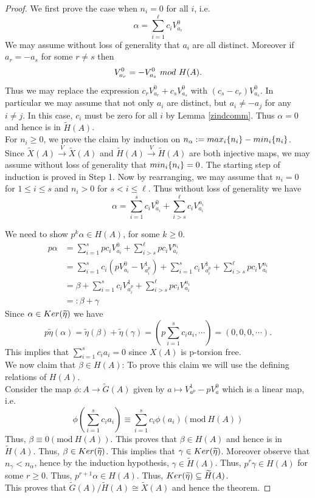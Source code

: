 \documentclass[10pt]{amsart}
\theoremstyle{plain}
\theoremstyle{definition}
\newcommand{\Ker}{{\rm Ker  }}
\renewcommand{\tilde}{\widetilde}
\newcommand{\ac}[1]{\{#1\}}
\begin{document}
\begin{proof}
 We first prove the case when $n_i=0$ for all $i$, i.e. 
$$ \alpha = \sum_{i=1}^\ell c_iV^0_{a_i}$$ 
We may assume without loss of generality that $a_i$ are all distinct. Moreover if $a_r=-a_s$ for some $r\neq s$ then 
$$ V^0_{a_r} = - V^0_{a_s} \ {\rm  mod} \ H(A).$$ Thus we may replace the expression $c_rV^0_{a_r}+c_sV^0_{a_s}$ with  $(c_s-c_r)V^0_{a_s}$. In particular we may assume that not only $a_i$ are distinct, but $a_i\neq -a_j$ for any $i\neq j$. In this case, $c_i$ must be zero for all $i$ by Lemma \ref{zindcomm}. Thus $\alpha=0$ and hence is in $\tilde{H}(A)$. \\

 For $n_i \geq 0$, we prove the claim by induction on $n_{\alpha}: = {\rm max}_i\ac{n_i}- {\rm min}_i \ac{n_i}$. Since $\tilde{X}(A) \xrightarrow{V} \tilde{X}(A)$ and $\tilde{H}(A)\xrightarrow{V} \tilde{H}(A)$ are both injective maps, we may assume without loss of generality that ${\rm min}_i \ac{n_i} = 0$.  The starting step of induction is proved in Step 1. Now by rearranging, we may assume that $n_i = 0$ for $1\leq i \leq s$ and $n_i>0$ for $s < i\leq \ell$. Thus without loss of generality we have 
$$ \alpha = \sum_{i=1}^s c_iV^0_{a_i} + \sum_{i>s}^\ell c_iV^{n_i}_{a_i}$$

\noindent We need to show $p^k \alpha \in H(A)$, for some $k \geq 0$.
\begin{align*}
p\alpha & = \sum_{i=1}^s pc_iV^0_{a_i} + \sum_{i>s}^\ell pc_iV^{n_i}_{a_i} \\ 
       & = \sum_{i=1}^s c_i (pV^0_{a_i}-V^1_{a_i^p}) +\sum_{i=1}^s c_iV^1_{a_i^p} + \sum_{i>s}^\ell pc_iV^{n_i}_{a_i} \\
            & = \beta + \sum_{i=1}^s c_iV^1_{a_i^p} + \sum_{i>s}^\ell pc_iV^{n_i}_{a_i} \\
            & =: \beta + \gamma 
\end{align*}
Since $\alpha \in \Ker(\tilde{\eta})$ we have 
$$p\tilde{\eta}(\alpha) = \tilde{\eta}(\beta) + \tilde{\eta}(\gamma) = (p\sum_{i=1}^sc_ia_i, \cdots ) = (0, 0, 0, \cdots).$$
This implies that $\sum_{i=1}^s c_ia_i = 0$ since $X(A)$ is p-torsion free.\\

\noindent We now claim that $\beta \in H(A)$: To prove this claim we will use the defining relations of $H(A)$.\\
 Consider the map  $\phi: A \to \tilde{G}(A)$ given by $ a \mapsto V^1_{a^p}-pV^0_{a}$ which is a linear map, i.e. 
 $$\phi(\sum_{i=1}^s c_ia_i) \equiv \sum_{i=1}^sc_i \phi(a_i) (\text{mod} \  H(A))$$
 Thus, $\beta \equiv 0 (\text{mod} \  H(A))$. This proves that $\beta \in H(A)$ and hence is in $\tilde{H}(A)$. Thus, $\beta \in \Ker(\tilde{\eta})$. This implies that $\gamma \in \Ker(\tilde{\eta})$. Moreover observe that $n_{\gamma} < n_{\alpha}$, hence by the induction hypothesis, $\gamma \in \tilde{H}(A)$.  Thus, $p^{r}\gamma \in H(A)$ for some $r \geq 0$. Thus, $p^{r+1}\alpha \in H(A)$. 
 Thus, $\Ker(\tilde{\eta}) \subseteq \tilde{H}(A)$. \\ 
 
\noindent This proves that $\tilde{G}(A)/ \tilde{H}(A) \cong \tilde{X}(A)$ and hence the theorem. 
\end{proof}
\end{document}
